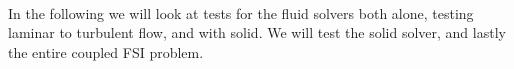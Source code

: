 \cite{Selin2014} \\
In the following we will look at tests for the fluid solvers both alone, testing laminar to turbulent flow, and with solid. We will test the solid solver, and lastly the entire coupled FSI problem. 


%













